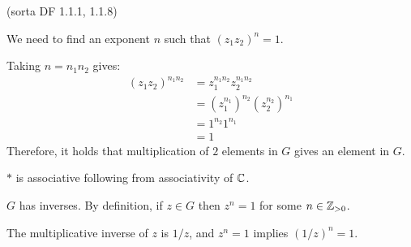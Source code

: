 \begin{problem}{\textsf{(sorta DF 1.1.1, 1.1.8)}}
\begin{enumalph}
\begin{Answer}
\begin{enumalph}
        \noindent
        We need to find an exponent $n$ such that $(z_1z_2)^n = 1$.
        
        Taking $n = n_1n_2$ gives:
        \begin{align*}
          (z_1z_2)^{n_1n_2} &= z_1^{n_1n_2}z_2^{n_1n_2} \\
          &= {(z_1^{n_1})}^{n_2}{(z_2^{n_2})}^{n_{1}} \\
          &= 1^{n_2}1^{n_1} \\
          &= 1
        \end{align*}
        Therefore, it holds that multiplication of $2$ elements in $G$ gives an element in $G$.
        \item $*$ is associative following from associativity of $\mathbb{C}$.
        \item $G$ has inverses. By definition, if $z \in G$ then $z^n = 1$ for some $n \in \mathbb{Z}_{>0}$.
        
        \noindent
        The multiplicative inverse of $z$ is $1/z$, and $z^{n} = 1$ implies ${(1/z)}^{n} = 1$.
      \end{enumalph}
    \end{Answer}
  \end{enumalph}
\end{problem}
  